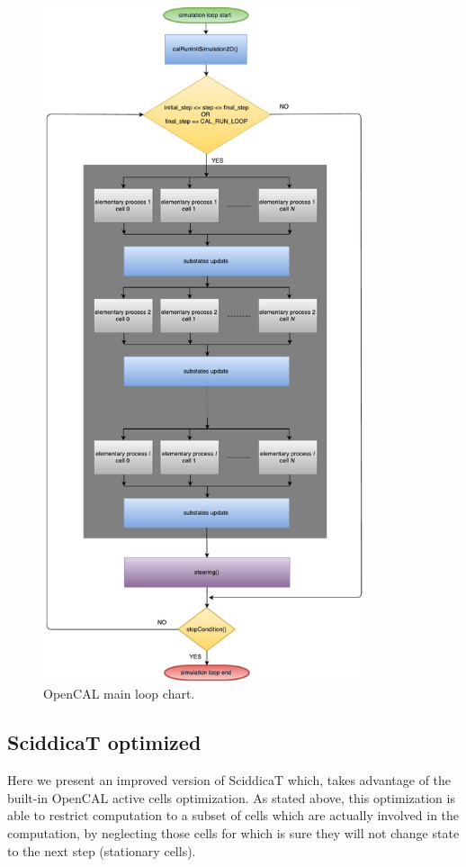 \begin{figure}[htbp]
  \centering
  \includegraphics[width=9.5cm]{./images/OpenCAL/opencal_main_loop.pdf}
  \caption{OpenCAL main loop chart.}
  \label{fig:opencal_main_loop}
\end{figure}


\subsection{SciddicaT optimized}
Here we present an improved version of SciddicaT which, takes
advantage of the built-in OpenCAL active cells optimization. As stated
above, this optimization is able to restrict computation to a subset
of cells which are actually involved in the computation, by neglecting
those cells for which is sure they will not change state to the next
step (stationary cells).

